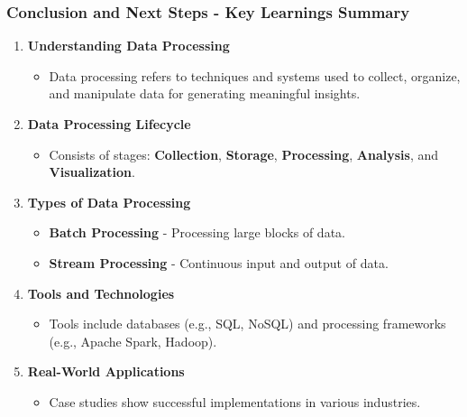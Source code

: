 \documentclass[aspectratio=169]{beamer}
\begin{document}
\begin{frame}[fragile]
  \frametitle{Conclusion and Next Steps - Key Learnings Summary}
  
  \begin{enumerate}
      \item \textbf{Understanding Data Processing}  
        \begin{itemize}
            \item Data processing refers to techniques and systems used to collect, organize, and manipulate data for generating meaningful insights.
        \end{itemize}

      \item \textbf{Data Processing Lifecycle}  
        \begin{itemize}
            \item Consists of stages: \textbf{Collection}, \textbf{Storage}, \textbf{Processing}, \textbf{Analysis}, and \textbf{Visualization}.
        \end{itemize}

      \item \textbf{Types of Data Processing}  
        \begin{itemize}
            \item \textbf{Batch Processing} - Processing large blocks of data.
            \item \textbf{Stream Processing} - Continuous input and output of data.
        \end{itemize}

      \item \textbf{Tools and Technologies}  
        \begin{itemize}
            \item Tools include databases (e.g., SQL, NoSQL) and processing frameworks (e.g., Apache Spark, Hadoop).
        \end{itemize}

      \item \textbf{Real-World Applications}  
        \begin{itemize}
            \item Case studies show successful implementations in various industries.
        \end{itemize}
  \end{enumerate}
\end{frame}
\end{document}
